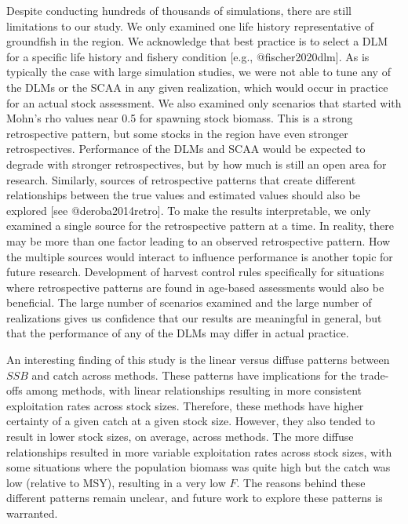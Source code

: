 \documentclass[
  12pt,
]{article}
\begin{document}
Despite conducting hundreds of thousands of simulations, there are still limitations to our study. We only examined one life history representative of groundfish in the region. We acknowledge that best practice is to select a DLM for a specific life history and fishery condition {[}e.g., @fischer2020dlm{]}. As is typically the case with large simulation studies, we were not able to tune any of the DLMs or the SCAA in any given realization, which would occur in practice for an actual stock assessment. We also examined only scenarios that started with Mohn's rho values near 0.5 for spawning stock biomass. This is a strong retrospective pattern, but some stocks in the region have even stronger retrospectives. Performance of the DLMs and SCAA would be expected to degrade with stronger retrospectives, but by how much is still an open area for research. Similarly, sources of retrospective patterns that create different relationships between the true values and estimated values should also be explored {[}see @deroba2014retro{]}. To make the results interpretable, we only examined a single source for the retrospective pattern at a time. In reality, there may be more than one factor leading to an observed retrospective pattern. How the multiple sources would interact to influence performance is another topic for future research. Development of harvest control rules specifically for situations where retrospective patterns are found in age-based assessments would also be beneficial. The large number of scenarios examined and the large number of realizations gives us confidence that our results are meaningful in general, but that the performance of any of the DLMs may differ in actual practice.

An interesting finding of this study is the linear versus diffuse patterns between \(SSB\) and catch across methods. These patterns have implications for the trade-offs among methods, with linear relationships resulting in more consistent exploitation rates across stock sizes. Therefore, these methods have higher certainty of a given catch at a given stock size. However, they also tended to result in lower stock sizes, on average, across methods. The more diffuse relationships resulted in more variable exploitation rates across stock sizes, with some situations where the population biomass was quite high but the catch was low (relative to MSY), resulting in a very low \(F\). The reasons behind these different patterns remain unclear, and future work to explore these patterns is warranted.
\end{document}
